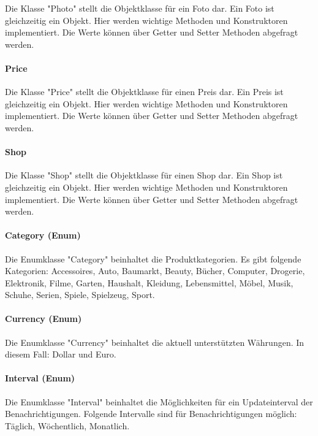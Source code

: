 \documentclass{scrartcl}
\begin{document}
Die Klasse "Photo" stellt die Objektklasse für ein Foto dar. Ein Foto ist gleichzeitig ein Objekt. Hier werden wichtige Methoden und Konstruktoren implementiert. Die Werte können über Getter und Setter Methoden abgefragt werden.

\paragraph{Price}

Die Klasse "Price" stellt die Objektklasse für einen Preis dar. Ein Preis ist gleichzeitig ein Objekt. Hier werden wichtige Methoden und Konstruktoren implementiert. Die Werte können über Getter und Setter Methoden abgefragt werden.

\paragraph{Shop}

Die Klasse "Shop" stellt die Objektklasse für einen Shop dar. Ein Shop ist gleichzeitig ein Objekt. Hier werden wichtige Methoden und Konstruktoren implementiert. Die Werte können über Getter und Setter Methoden abgefragt werden.

\paragraph{Category (Enum)}

Die Enumklasse "Category" beinhaltet die Produktkategorien. Es gibt folgende Kategorien: Accessoires, Auto, Baumarkt, Beauty, Bücher, Computer, Drogerie, Elektronik, Filme, Garten, Haushalt, Kleidung, Lebensmittel, Möbel, Musik, Schuhe, Serien, Spiele, Spielzeug, Sport.

\paragraph{Currency (Enum)}

Die Enumklasse "Currency" beinhaltet die aktuell unterstützten Währungen. In diesem Fall: Dollar und Euro.

\paragraph{Interval (Enum)}

Die Enumklasse "Interval" beinhaltet die Möglichkeiten für ein Updateinterval der Benachrichtigungen. Folgende Intervalle sind für Benachrichtigungen möglich: Täglich, Wöchentlich, Monatlich.
\end{document}

